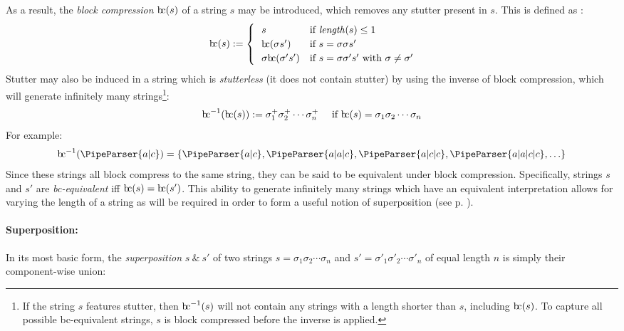 \documentclass[a4paper,12pt,leqno]{article}
\newcommand{\bc}{{\rm b\!c}}
\newcommand{\vph}[1]{\vphantom{#1}}
\newcommand{\ebox}[1]{\fbox{$\vph{'(),}#1$}}
\renewcommand{\sp}{~\&~}
\newcommand{\EventString}[1]{
	\renewcommand*{\do}[1]{\ebox{##1}}%
	\PipeParser{#1}
}
\begin{document}
As a result, the \textit{block compression} $\bc(s)$ of a string $s$ may be introduced, which removes any stutter present in $s$. This is defined as \citep{fernando2015semantics, woods2017towards}:
\begin{align}\label{def:bc}
\bc(s) := 
\begin{cases}
	~~s & \text{if \textit{length}}(s) \leq 1\\
	~~\bc(\sigma s') & \text{if } s = \sigma \sigma s'\\
	~~\sigma \bc(\sigma' s') & \text{if } s = \sigma \sigma' s' \text{ with } \sigma \neq \sigma'
\end{cases}
\end{align}
Stutter may also be induced in a string which is \textit{stutterless} (it does not contain stutter) by using the inverse of block compression, which will generate infinitely many strings\footnote{If the string $s$ features stutter, then $\bc^{-1}(s)$ will not contain any strings with a length shorter than $s$, including $\bc(s)$. To capture all possible \bc-equivalent strings, $s$ is block compressed before the inverse is applied.}:
\begin{align}\label{def:inverse-bc}
\bc^{-1}(\bc(s)) := \sigma_1^+ \sigma_2^+ \cdots \sigma_n^+ ~~~ \mbox{ if } \bc(s) = \sigma_1 \sigma_2 \cdots \sigma_n
\end{align}
For example:
\begin{align}\label{ex:inverse-bc}
	\bc^{-1}(\EventString{a|c}) = \{\EventString{a|c}, \EventString{a|a|c}, \EventString{a|c|c}, \EventString{a|a|c|c}, \ldots\}
\end{align}
Since these strings all block compress to the same string, they can be said to be equivalent under block compression. Specifically, strings $s$ and $s'$ are \textit{\bc -equivalent} iff $\bc(s) = \bc(s')$. This ability to generate infinitely many strings which have an equivalent interpretation allows for varying the length of a string as will be required in order to form a useful notion of superposition (see p. \pageref{def:initial-async-superposition}).

\paragraph{Superposition:}\label{para:str-op-sp}
In its most basic form, the \textit{superposition} $s \sp s'$ of two strings $s = \sigma_1\sigma_2\cdots\sigma_n$ and $s' = \sigma'_1\sigma'_2\cdots\sigma'_n$ of equal length $n$ is simply their component-wise union:
\end{document}
